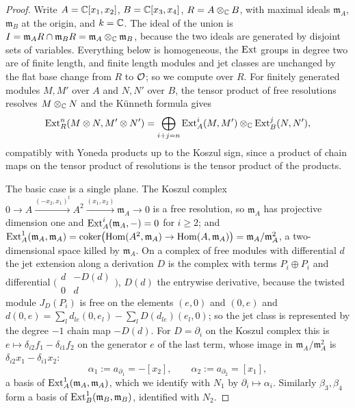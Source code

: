 \begin{proof}
Write $A=\mathbb{C}[x_{1},x_{2}]$, $B=\mathbb{C}[x_{3},x_{4}]$, $R=A\otimes_{\mathbb{C}}B$, with
maximal ideals $\mathfrak m_{A}$, $\mathfrak m_{B}$ at the origin, and
$k=\mathbb{C}$. The ideal of the union is $I=\mathfrak m_{A}R\cap\mathfrak m_{B}R
=\mathfrak m_{A}\otimes_{\mathbb{C}}\mathfrak m_{B}$, because the two ideals are
generated by disjoint sets of variables. Everything below is homogeneous, the
$\operatorname{Ext}$ groups in degree two are of finite length, and finite length modules
and jet classes are unchanged by the flat base change from $R$ to $\mathcal{O}$; so we
compute over $R$. For finitely generated modules $M,M'$ over $A$ and $N,N'$
over $B$, the tensor product of free resolutions resolves $M\otimes_{\mathbb{C}}N$
and the K\"unneth formula gives
\begin{equation}\label{eq:kunnethext}
  \operatorname{Ext}^{n}_{R}(M\otimes N,M'\otimes N')
  =\bigoplus_{i+j=n}\operatorname{Ext}^{i}_{A}(M,M')\otimes_{\mathbb{C}}\operatorname{Ext}^{j}_{B}(N,N'),
\end{equation}
compatibly with Yoneda products up to the Koszul sign, since a product of
chain maps on the tensor product of resolutions is the tensor product of the
products.

The basic case is a single plane. The Koszul complex
$0\to A\xrightarrow{(-x_{2},x_{1})^{t}}A^{2}\xrightarrow{(x_{1},x_{2})}\mathfrak m_{A}\to0$
is a free resolution, so $\mathfrak m_{A}$ has projective dimension one and
$\operatorname{Ext}^{i}_{A}(\mathfrak m_{A},-)=0$ for $i\ge2$; and
$\operatorname{Ext}^{1}_{A}(\mathfrak m_{A},\mathfrak m_{A})=\operatorname{coker}\bigl(\operatorname{Hom}(A^{2},\mathfrak m_{A})
\to\operatorname{Hom}(A,\mathfrak m_{A})\bigr)=\mathfrak m_{A}/\mathfrak m_{A}^{2}$, a
two-dimensional space killed by $\mathfrak m_{A}$. On a complex of free
modules with differential $d$ the jet extension along a derivation $D$ is the
complex with terms $P_{i}\oplus P_{i}$ and differential
$\bigl(\begin{smallmatrix}d&-D(d)\\0&d\end{smallmatrix}\bigr)$, $D(d)$ the
entrywise derivative, because the twisted module $J_{D}(P_{i})$ is free on the
elements $(e,0)$ and $(0,e)$ and $d(0,e)=\sum_{l}d_{le}(0,e_{l})-\sum_{l}D(d_{le})(e_{l},0)$;
so the jet class is represented by the degree $-1$ chain map $-D(d)$. For
$D=\partial_{i}$ on the Koszul complex this is $e\mapsto\delta_{i2}f_{1}-\delta_{i1}f_{2}$
on the generator $e$ of the last term, whose image in
$\mathfrak m_{A}/\mathfrak m_{A}^{2}$ is $\delta_{i2}x_{1}-\delta_{i1}x_{2}$:
\[
  \alpha_{1}:=a_{\partial_{1}}=-[x_{2}],\qquad
  \alpha_{2}:=a_{\partial_{2}}=[x_{1}],
\]
a basis of $\operatorname{Ext}^{1}_{A}(\mathfrak m_{A},\mathfrak m_{A})$, which we identify
with $N_{1}$ by $\partial_{i}\mapsto\alpha_{i}$. Similarly $\beta_{3},\beta_{4}$
form a basis of $\operatorname{Ext}^{1}_{B}(\mathfrak m_{B},\mathfrak m_{B})$, identified
with $N_{2}$.


\end{proof}
